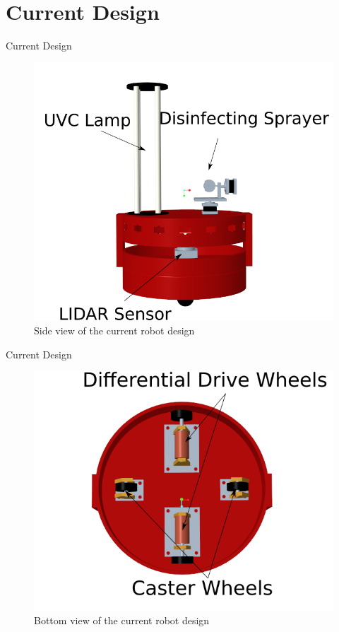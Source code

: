 \documentclass{beamer}
\begin{document}
\section{Current Design}
\begin{frame}{Current Design}{}
\begin{figure}
    \centering
    \includegraphics[scale=0.3]{figs/img/frontViewScreenshotA}
    \caption{Side view of the current robot design}
    \label{fig:sideViewRobot}
\end{figure}
\end{frame}

\begin{frame}{Current Design}{}
\begin{figure}
	\centering
	\includegraphics[scale=0.3]{figs/img/bottomViewScreenshotA}
	\caption{Bottom view of the current robot design}
	\label{fig:bottomViewRobot}
\end{figure}

\end{frame}
\end{document}
